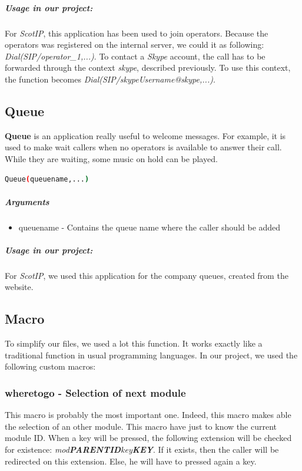 \subparagraph{Usage in our project:}
For \textit{ScotIP}, this application has been used to join operators. Because the operators was registered on the internal server, we could it as following: \textit{Dial(SIP/operator\_1,...)}. To contact a \textit{Skype} account, the call has to be forwarded through the context \textit{skype}, described previously. To use this context, the function becomes \textit{Dial(SIP/skypeUsername@skype,...)}.





\subsection{Queue}
\textbf{Queue} is an application really useful to welcome messages. For example, it is used to make wait callers when no operators is available to answer their call. While they are waiting, some music on hold can be played. 


\begin{lstlisting}[language=bash,caption={Syntax of application Playback}]
Queue(queuename,...)
\end{lstlisting}

\subparagraph{Arguments}
\begin{itemize}

	\item queuename - Contains the queue name where the caller should be added
\end{itemize}

\subparagraph{Usage in our project:}
For \textit{ScotIP}, we used this application for the company queues, created from the website.



\subsection{Macro}
To simplify our files, we used a lot this function. It works exactly like a traditional function in usual programming languages. In our project, we used the following custom macros:

\subsubsection{wheretogo - Selection of next module}
This macro is probably the most important one. Indeed, this macro makes able the selection of an other module. This macro have just to know the current module ID. When a key will be pressed, the following extension will be checked for existence: \textit{mod\textbf{PARENTID}key\textbf{KEY}}. If it exists, then the caller will be redirected on this extension. Else, he will have to pressed again a key.

